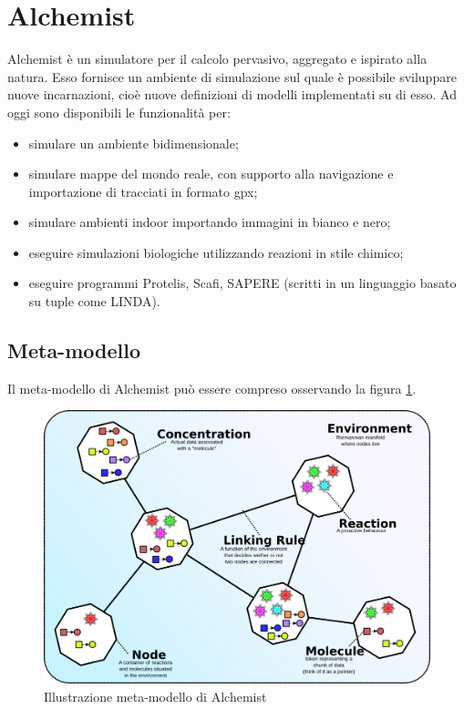 \section{Alchemist}
Alchemist \`e un simulatore per il calcolo pervasivo, aggregato e ispirato alla natura. Esso fornisce un ambiente di simulazione sul quale \`e possibile sviluppare nuove incarnazioni, cio\`e nuove definizioni di modelli implementati su di esso. Ad oggi sono disponibili le funzionalit\`a per:
\begin{itemize}
\item simulare un ambiente bidimensionale;
\item simulare mappe del mondo reale, con supporto alla navigazione e importazione di tracciati in formato gpx;
\item simulare ambienti indoor importando immagini in bianco e nero;
\item eseguire simulazioni biologiche utilizzando reazioni in stile chimico;
\item eseguire programmi Protelis, Scafi, SAPERE (scritti in un linguaggio basato su tuple come LINDA).
\end{itemize}

\subsection{Meta-modello}
Il meta-modello di Alchemist pu\`o essere compreso osservando la figura \ref{fig:alchemistModel}.
\begin{figure}[h] %
\begin{center} %
\includegraphics[width=12.5cm]{images/AlchemistModel.png} %
\caption[Illustrazione meta-modello di Alchemist]{Illustrazione meta-modello di Alchemist} \label{fig:alchemistModel}
\end{center}
\end{figure}

